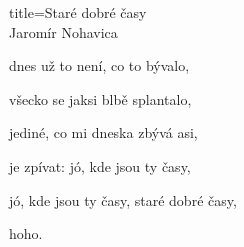 \begin{song}{title=\predtitle \centering Staré dobré časy \\\large Jaromír Nohavica }
{\begin{centerjustified}
\begin{varwidth}[t]{0.48\textwidth}
dnes už to není, co to bývalo,

všecko se jaksi blbě splantalo,

jediné, co mi dneska zbývá asi,

je zpívat: jó, kde jsou ty časy,

jó, kde jsou ty časy, staré dobré časy,

hoho.

\end{varwidth}

\end{centerjustified}
}
\setcounter{Slokočet}{0}
\end{song}
